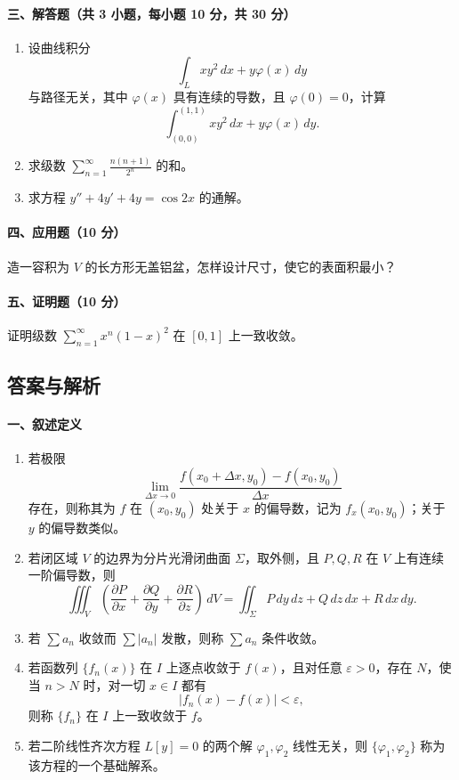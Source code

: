 \paragraph*{三、解答题（共 3 小题，每小题 10 分，共 30 分）}
\begin{enumerate}
  \item 设曲线积分
  \[
    \int_L xy^2\,dx+y\varphi(x)\,dy
  \]
  与路径无关，其中 $\varphi(x)$ 具有连续的导数，且 $\varphi(0)=0$，计算
  \[
    \int_{(0,0)}^{(1,1)} xy^2\,dx+y\varphi(x)\,dy .
  \]
  \item 求级数 $\displaystyle \sum_{n=1}^\infty \frac{n(n+1)}{2^n}$ 的和。
  \item 求方程 $y''+4y'+4y=\cos 2x$ 的通解。
\end{enumerate}

\paragraph*{四、应用题（10 分）}
造一容积为 $V$ 的长方形无盖铝盆，怎样设计尺寸，使它的表面积最小？

\paragraph*{五、证明题（10 分）}
证明级数 $\displaystyle \sum_{n=1}^\infty x^n(1-x)^2$ 在 $[0,1]$ 上一致收敛。

\subsection{答案与解析}

\paragraph*{一、叙述定义}
\begin{enumerate}
  \item 若极限
  \[
    \lim_{\Delta x\to 0}\frac{f(x_0+\Delta x,y_0)-f(x_0,y_0)}{\Delta x}
  \]
  存在，则称其为 $f$ 在 $(x_0,y_0)$ 处关于 $x$ 的偏导数，记为 $f_x(x_0,y_0)$；关于 $y$ 的偏导数类似。
  \item 若闭区域 $V$ 的边界为分片光滑闭曲面 $\Sigma$，取外侧，且 $P,Q,R$ 在 $V$ 上有连续一阶偏导数，则
  \[
    \iiint_V\left(\frac{\partial P}{\partial x}+\frac{\partial Q}{\partial y}+\frac{\partial R}{\partial z}\right)\,dV
    =
    \iint_\Sigma P\,dy\,dz+Q\,dz\,dx+R\,dx\,dy .
  \]
  \item 若 $\sum a_n$ 收敛而 $\sum |a_n|$ 发散，则称 $\sum a_n$ 条件收敛。
  \item 若函数列 $\{f_n(x)\}$ 在 $I$ 上逐点收敛于 $f(x)$，且对任意 $\varepsilon>0$，存在 $N$，使当 $n>N$ 时，对一切 $x\in I$ 都有
  \[
    |f_n(x)-f(x)|<\varepsilon,
  \]
  则称 $\{f_n\}$ 在 $I$ 上一致收敛于 $f$。
  \item 若二阶线性齐次方程 $L[y]=0$ 的两个解 $\varphi_1,\varphi_2$ 线性无关，则 $\{\varphi_1,\varphi_2\}$ 称为该方程的一个基础解系。
\end{enumerate}

